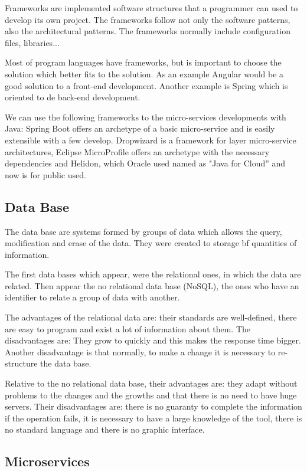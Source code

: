 \documentclass[12pt]{report} %
\begin{document}
Frameworks are implemented software structures that a programmer can used to develop its own project. The frameworks follow not only the software patterns, also the architectural patterns. The frameworks normally include configuration files, libraries...

Most of program languages have frameworks, but is important to choose the solution which better fits to the solution. As an example Angular would be a good solution to a front-end development. Another example is Spring which is oriented to de back-end development.

We can use the following frameworks to the micro-services developments with Java: Spring Boot offers an archetype of a basic micro-service and is easily extensible with a few develop. Dropwizard is a framework for layer micro-service architectures, Eclipse MicroProfile offers an archetype with the necessary dependencies and Helidon, which Oracle used named as "Java for Cloud” and now is for public used. 

\subsection{Data Base}

The data base are systems formed by groups of data which allows the query, modification and erase of the data. They were created to storage bf quantities of information.

The first data bases which appear, were the relational ones, in which the data are related. Then appear the no relational data base (NoSQL), the ones who have an identifier to relate a group of data with another.

The advantages of the relational data are: their standards are well-defined, there are easy to program and exist a lot of information about them. The disadvantages are: They grow to quickly and this makes the response time bigger. Another disadvantage is that normally, to make a change it is necessary to re-structure the data base.

Relative to the no relational data base, their advantages are: they adapt without problems to the changes and the growths and that there is no need to have huge servers. Their disadvantages are: there is no guaranty to complete the information if the operation fails, it is necessary to have a large knowledge of the tool, there is no standard language and there is no graphic interface.

\subsection{Microservices}
\end{document}
